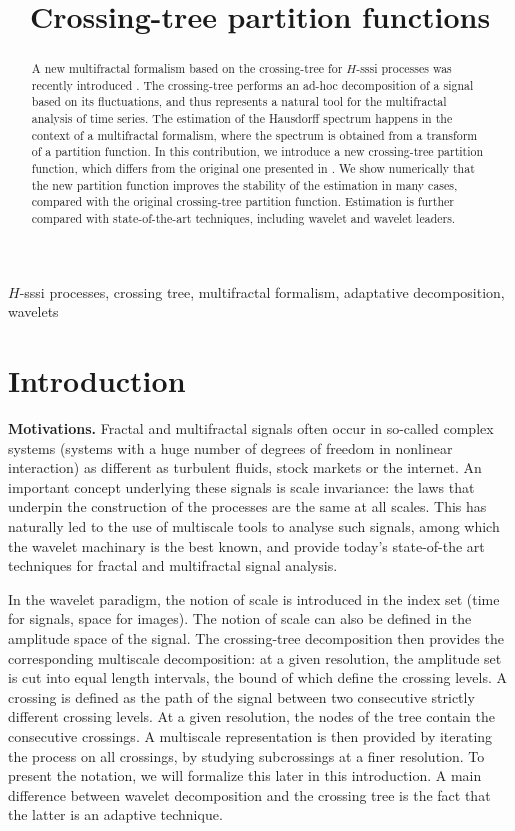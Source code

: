 \documentclass[a4paper]{article}
\title{Crossing-tree partition functions}
\begin{document}
%
\maketitle
%
\begin{abstract}
A new multifractal formalism based on the crossing-tree for $H$-sssi processes was recently introduced \cite{DecrAJ13, DecrA15}.
The crossing-tree performs an ad-hoc decomposition of a signal based on its fluctuations, and thus represents a natural tool for the multifractal analysis of time series. 
The estimation of the Hausdorff spectrum happens in the context of a multifractal formalism, where the spectrum is obtained from a transform of a partition function.
In this contribution, we introduce a new crossing-tree partition function, which differs from the original one presented in \cite{DecrA15}.
We show numerically that the new partition function improves the stability of the estimation in many cases, compared with the original crossing-tree partition function. 
Estimation is further compared with state-of-the-art techniques, including wavelet and wavelet leaders.  
\end{abstract}
%
\begin{keywords}
$H$-sssi processes, crossing tree, multifractal formalism, adaptative decomposition, wavelets
\end{keywords}
%
\section{Introduction}
\label{sec:intro}


{\bf Motivations.} Fractal and multifractal signals often occur in so-called complex systems (systems with a huge number of degrees of freedom in nonlinear interaction) as different as turbulent fluids, stock markets or the internet. An important concept underlying these signals is scale invariance: the laws that underpin the construction of the processes are the same at all scales. This has naturally led to the use of multiscale tools to analyse such signals, among which the wavelet machinary is the best known, and provide today's state-of-the art techniques for fractal and multifractal signal analysis.  

In the wavelet paradigm, the notion of scale is introduced in the index set (time for signals, space for images). 
The notion of scale can also be defined in the amplitude space of the signal. The crossing-tree decomposition then provides the corresponding multiscale decomposition: at  a given resolution, the amplitude set is cut into equal length intervals, the bound of which define the crossing levels. A crossing is defined as the path of the signal between two consecutive strictly different crossing levels. At a given resolution, the nodes of the tree contain the consecutive crossings. A multiscale representation is then provided by iterating the process on all crossings, by studying subcrossings at a finer resolution. To present the notation, we will formalize this later in this introduction. 
A main difference between wavelet decomposition and the crossing tree is the fact that the latter is an adaptive technique.
\end{document}
